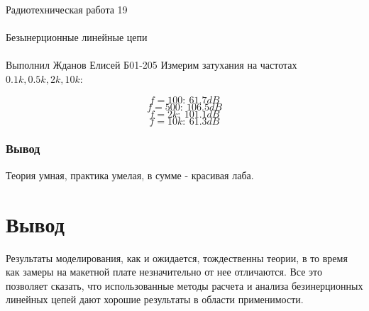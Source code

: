 \documentclass{astroedu-lab}
\begin{document}
\begin{problem}{\huge Радиотехническая работа 19\\\\Безынерционные линейные цепи\\\\Выполнил Жданов Елисей Б01-205}
Измерим затухания на частотах $0.1k, 0.5k,  2k, 10k$:

\[f = 100: \: 61.7 dB\]
\[f = 500: \: 106.5 dB\]
\[f = 2k: \: 101.1 dB\]
\[f = 10k: \: 61.3 dB\]

\subsubsection{Вывод}

Теория умная, практика умелая, в сумме - красивая лаба.

\section{Вывод}

Результаты моделирования, как и ожидается, тождественны теории, в то время как замеры на макетной плате незначительно от нее отличаются. Все это позволяет сказать, что использованные методы расчета и анализа безинерционных линейных цепей дают хорошие результаты в области применимости.


\end{problem}
\end{document}
